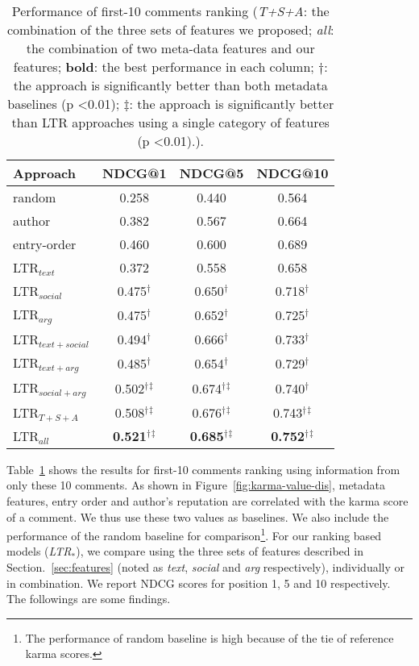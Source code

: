 \documentclass[11pt]{article}
\begin{document}
\begin{table}
\begin{center}
\small

\begin{tabular}{l|c|c|c}
\hline
Approach & NDCG@1 & NDCG@5 & NDCG@10\\
\hline
\hline
random& 0.258 & 0.440 &0.564\\
\hline
author & 0.382 & 0.567 & 0.664 \\
entry-order & 0.460 & 0.600 &0.689\\
\hline
LTR$_{text}$ & 0.372 &0.558  &0.658 \\
LTR$_{social}$ & 0.475$^\dagger$ &0.650$^\dagger$  &0.718$^\dagger$\\
LTR$_{arg}$ &0.475$^\dagger$ & 0.652$^\dagger$&0.725$^\dagger$\\
\hline
LTR$_{text+social}$ & 0.494$^\dagger$ &0.666$^\dagger$  &0.733$^\dagger$ \\
LTR$_{text+arg}$ & 0.485$^\dagger$ &0.654$^\dagger$  &0.729$^\dagger$\\
LTR$_{social+arg}$ &0.502$^\dagger$$^\ddagger$ & 0.674$^\dagger$$^\ddagger$&0.740$^\dagger$\\
\hline
LTR$_{T+S+A}$& 0.508$^\dagger$$^\ddagger$ &0.676$^\dagger$$^\ddagger$ &0.743$^\dagger$$^\ddagger$\\
\hline
LTR$_{all}$& \textbf{0.521}$^\dagger$$^\ddagger$ &\textbf{0.685}$^\dagger$$^\ddagger$ &\textbf{0.752}$^\dagger$$^\ddagger$\\
\hline 
\end{tabular}
\end{center} 
\caption{Performance of first-10 comments ranking (\emph{T+S+A}: the combination of the three sets of features we proposed; \emph{all}: the combination of two meta-data features and our features; \textbf{bold}: the best performance in each column; $\dagger$: the approach is significantly better than both metadata baselines (p \textless 0.01); $\ddagger$: the approach is significantly better than LTR approaches using a single category of features (p \textless 0.01).).}
\label{tab:overall-performance}
\end{table}

Table~\ref{tab:overall-performance} shows the results for first-10 comments ranking
using information from only these 10 comments. As shown in Figure~\ref{fig:karma-value-dis}, metadata features, entry order and author's reputation are correlated with the karma score of a comment. We thus use these two values as baselines. We also include the performance of the random baseline for comparison\footnote{The performance of random baseline is high because of the tie of reference karma scores.}. For our ranking based models (\emph{LTR$_{*}$}), we compare using the three sets of features described in Section.~\ref{sec:features} (noted as \emph{text}, \emph{social} and \emph{arg} respectively), individually or in combination. We report NDCG scores for position 1, 5 and 10 respectively. The followings are some findings.
\end{document}
